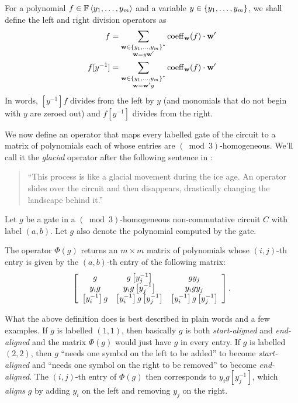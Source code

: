 \begin{definition}
  For a polynomial $f \in \mathbb{F}\left\langle y_1,\ldots, y_m\right\rangle$ and a variable $y \in \left\{y_1,\ldots, y_m\right\}$, we shall define the left and right division operators as
  \begin{align*}
    [y^{-1}] f & = \sum_{\substack{\vecw\in \set{y_1,\ldots, y_m}^*\\ \vecw = y \vecw'}} \coeff_\vecw(f) \cdot \vecw'\\
     f [y^{-1}] & = \sum_{\substack{\vecw\in \set{y_1,\ldots, y_m}^*\\ \vecw = \vecw' y}} \coeff_\vecw(f) \cdot \vecw'
  \end{align*}
  In words, $[y^{-1}] f$ divides from the left by $y$ (and monomials that do not begin with $y$ are zeroed out) and $f [y^{-1}]$ divides from the right. 
\end{definition}

We now define an operator that maps every labelled gate of the circuit to a matrix of polynomials each of whose entries are $(\bmod{3})$-homogeneous. We'll call it the \emph{glacial} operator after the following sentence in \cite{CILM18}:
\begin{quote}
  ``This process is like a glacial movement during the ice age. An operator slides over the circuit and then disappears, drastically changing the landscape behind it.''
\end{quote}

\begin{definition}
  Let $g$ be a gate in a $(\bmod{3})$-homogeneous non-commutative circuit $C$ with label $(a,b)$. Let $g$ also denote the polynomial computed by the gate.

The operator $\Phi(g)$ returns an $m\times m$ matrix of polynomials whose $(i,j)$-th entry is given by the $(a,b)$-th entry of the following matrix:
\begin{align*}
  \left[
  \begin{array}{ccc}
    g & g\left[y_j^{-1}\right] & g y_j\\
    y_i g & y_i g\left[y_j^{-1}\right] & y_i gy_j\\
    \left[y_i^{-1}\right] g & \left[y_i^{-1}\right] g\left[y_j^{-1}\right] & \left[y_i^{-1}\right] g\left[y_j^{-1}\right]\\
  \end{array}
  \right].
\end{align*}
\end{definition}
What the above definition does is best described in plain words and a few examples. If $g$ is labelled $(1,1)$, then basically $g$ is both \emph{start-aligned} and \emph{end-aligned} and the matrix $\Phi(g)$ would just have $g$ in every entry. If $g$ is labelled $(2,2)$, then $g$ ``needs one symbol on the left to be added'' to become \emph{start-aligned} and ``needs one symbol on the right to be removed'' to become \emph{end-aligned}. The $(i,j)$-th entry of $\Phi(g)$ then corresponds to $y_i g [y_j^{-1}]$, which \emph{aligns} $g$ by adding $y_i$ on the left and removing $y_j$ on the right. 

